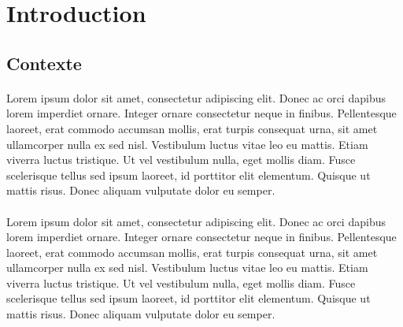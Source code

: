 \section{Introduction}

\subsection{Contexte}

\paragraph{}
Lorem ipsum dolor sit amet, consectetur adipiscing elit. Donec ac orci dapibus lorem imperdiet ornare. Integer ornare consectetur neque in finibus. Pellentesque laoreet, erat commodo accumsan mollis, erat turpis consequat urna, sit amet ullamcorper nulla ex sed nisl. Vestibulum luctus vitae leo eu mattis. Etiam viverra luctus tristique. Ut vel vestibulum nulla, eget mollis diam. Fusce scelerisque tellus sed ipsum laoreet, id porttitor elit elementum. Quisque ut mattis risus. Donec aliquam vulputate dolor eu semper. 

\paragraph{}
Lorem ipsum dolor sit amet, consectetur adipiscing elit. Donec ac orci dapibus lorem imperdiet ornare. Integer ornare consectetur neque in finibus. Pellentesque laoreet, erat commodo accumsan mollis, erat turpis consequat urna, sit amet ullamcorper nulla ex sed nisl. Vestibulum luctus vitae leo eu mattis. Etiam viverra luctus tristique. Ut vel vestibulum nulla, eget mollis diam. Fusce scelerisque tellus sed ipsum laoreet, id porttitor elit elementum. Quisque ut mattis risus. Donec aliquam vulputate dolor eu semper. 